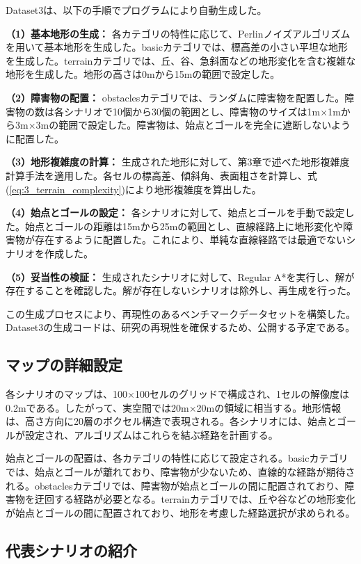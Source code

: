 Dataset3は、以下の手順でプログラムにより自動生成した。

\textbf{（1）基本地形の生成：}
各カテゴリの特性に応じて、Perlinノイズアルゴリズムを用いて基本地形を生成した。basicカテゴリでは、標高差の小さい平坦な地形を生成した。terrainカテゴリでは、丘、谷、急斜面などの地形変化を含む複雑な地形を生成した。地形の高さは0mから15mの範囲で設定した。

\textbf{（2）障害物の配置：}
obstaclesカテゴリでは、ランダムに障害物を配置した。障害物の数は各シナリオで10個から30個の範囲とし、障害物のサイズは1m×1mから3m×3mの範囲で設定した。障害物は、始点とゴールを完全に遮断しないように配置した。

\textbf{（3）地形複雑度の計算：}
生成された地形に対して、第3章で述べた地形複雑度計算手法を適用した。各セルの標高差、傾斜角、表面粗さを計算し、式(\ref{eq:3_terrain_complexity})により地形複雑度を算出した。

\textbf{（4）始点とゴールの設定：}
各シナリオに対して、始点とゴールを手動で設定した。始点とゴールの距離は15mから25mの範囲とし、直線経路上に地形変化や障害物が存在するように配置した。これにより、単純な直線経路では最適でないシナリオを作成した。

\textbf{（5）妥当性の検証：}
生成されたシナリオに対して、Regular A*を実行し、解が存在することを確認した。解が存在しないシナリオは除外し、再生成を行った。

この生成プロセスにより、再現性のあるベンチマークデータセットを構築した。Dataset3の生成コードは、研究の再現性を確保するため、公開する予定である。

\subsection{マップの詳細設定}

各シナリオのマップは、100×100セルのグリッドで構成され、1セルの解像度は0.2mである。したがって、実空間では20m×20mの領域に相当する。地形情報は、高さ方向に20層のボクセル構造で表現される。各シナリオには、始点とゴールが設定され、アルゴリズムはこれらを結ぶ経路を計画する。

始点とゴールの配置は、各カテゴリの特性に応じて設定される。basicカテゴリでは、始点とゴールが離れており、障害物が少ないため、直線的な経路が期待される。obstaclesカテゴリでは、障害物が始点とゴールの間に配置されており、障害物を迂回する経路が必要となる。terrainカテゴリでは、丘や谷などの地形変化が始点とゴールの間に配置されており、地形を考慮した経路選択が求められる。

\subsection{代表シナリオの紹介}

